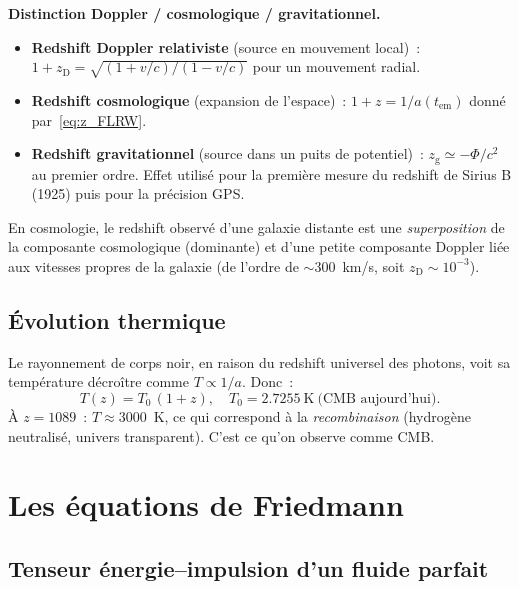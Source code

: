 \documentclass[11pt,a4paper,openany]{report}
\begin{document}
\begin{tcolorbox}[approfondir]
\textbf{Distinction Doppler / cosmologique / gravitationnel.}
\begin{itemize}[topsep=2pt]
\item \textbf{Redshift Doppler relativiste} (source en mouvement local)~:
  $1+z_{\mathrm{D}} = \sqrt{(1+v/c)/(1-v/c)}$ pour un mouvement radial.
\item \textbf{Redshift cosmologique} (expansion de l'espace)~:
  $1+z = 1/a(t_{\text{em}})$ donné par~\eqref{eq:z_FLRW}.
\item \textbf{Redshift gravitationnel} (source dans un puits de potentiel)~:
  $z_{\mathrm{g}} \simeq -\Phi/c^{2}$ au premier ordre. Effet
  utilisé pour la première mesure du redshift de Sirius B (1925) puis
  pour la précision GPS.
\end{itemize}

En cosmologie, le redshift observé d'une galaxie distante est une
\emph{superposition} de la composante cosmologique (dominante) et d'une
petite composante Doppler liée aux vitesses propres de la galaxie (de l'ordre
de $\sim 300$~km/s, soit $z_{\mathrm{D}}\sim 10^{-3}$).
\end{tcolorbox}

\section{Évolution thermique}

\begin{tcolorbox}[mathspe]
Le rayonnement de corps noir, en raison du redshift universel des photons,
voit sa température décroître comme $T \propto 1/a$. Donc~:
\[
T(z) = T_{0}\,(1+z), \quad T_{0} = \SI{2.7255}{\kelvin}~\text{(CMB aujourd'hui)}.
\]
À $z=1089$~: $T \approx 3000$~K, ce qui correspond à la \emph{recombinaison}
(hydrogène neutralisé, univers transparent). C'est ce qu'on observe comme CMB.
\end{tcolorbox}

\chapter{Les équations de Friedmann}
\label{chap:friedmann}

\section{Tenseur énergie--impulsion d'un fluide parfait}
\end{document}
